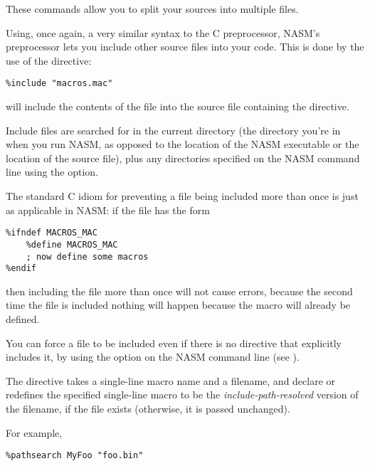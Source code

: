 These commands allow you to split your sources into multiple files.


Using, once again, a very similar syntax to the C preprocessor,
NASM's preprocessor lets you include other source files into your
code. This is done by the use of the  directive:

\begin{lstlisting}
%include "macros.mac"
\end{lstlisting}

will include the contents of the file  into the source
file containing the  directive.

Include files are searched for in the
current directory (the directory you're in when you run NASM, as
opposed to the location of the NASM executable or the location of
the source file), plus any directories specified on the NASM command
line using the  option.

The standard C idiom for preventing a file being included more than
once is just as applicable in NASM: if the file  has
the form

\begin{lstlisting}
%ifndef MACROS_MAC
    %define MACROS_MAC
    ; now define some macros
%endif
\end{lstlisting}

then including the file more than once will not cause errors,
because the second time the file is included nothing will happen
because the macro  will already be defined.

You can force a file to be included even if there is no 
directive that explicitly includes it, by using the  option
on the NASM command line (see ).


The  directive takes a single-line macro name and a
filename, and declare or redefines the specified single-line macro to
be the \emph{include-path-resolved} version of the filename, if the file
exists (otherwise, it is passed unchanged).

For example,

\begin{lstlisting}
%pathsearch MyFoo "foo.bin"
\end{lstlisting}

